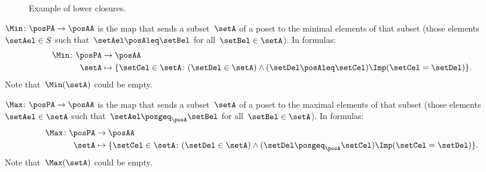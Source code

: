 \begin{figure*}[h!]
    \centering
    \caption{Example of lower closures.}
    \label{fig:examplebatt}
\end{figure*}


\begin{definition}[Min]
    \label{def:Min}
    $\Min \colon \posPA \to \posAA$ is the map that sends a subset~$\setA$ of a poset to the minimal elements of that subset (those elements~$\setAel \in S$ such that~$\setAel \posAleq \setBel$ for all~$\setBel \in \setA$).
    In formulas:
    \begin{equation*}
        \begin{aligned}
            \Min \colon \posPA &\to \posAA\\
            \setA&\mapsto \{ \setCel\in \setA\colon (\setDel\in \setA)\wedge(\setDel\posAleq \setCel)\Imp (\setCel=\setDel)\}.
        \end{aligned}
    \end{equation*}
    Note that~$\Min(\setA)$ could be empty.
\end{definition}

\begin{definition}[Max]
    \label{def:Max}
    $\Max \colon \posPA \to \posAA$ is the map that sends a subset~$\setA$ of a poset to the maximal elements of that subset (those elements~$\setAel \in \setA$ such that~$\setAel \posgeq_\posA \setBel$ for all~$\setBel \in \setA$).
    In formulas:
    \begin{equation*}
        \begin{aligned}
            \Max \colon \posPA &\to \posAA\\
            \setA&\mapsto \{ \setCel\in \setA\colon (\setDel\in \setA)\wedge(\setDel\posgeq_\posA \setCel)\Imp (\setCel=\setDel)\}.
        \end{aligned}
    \end{equation*}
    Note that~$\Max(\setA)$ could be empty.
\end{definition}

